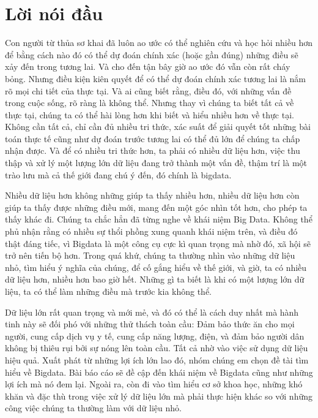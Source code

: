 \documentclass[12pt]{report}
\begin{document}

\newpage
\setcounter{page}{1}
\tableofcontents
\newpage
\chapter*{Lời nói đầu}
Con người từ thủa sơ khai đã luôn ao ước có thể nghiên cứu và học hỏi nhiều hơn để bằng cách nào đó có thể dự đoán chính xác (hoặc gần đúng) những điều sẽ xảy đến trong tương lai. Và cho đến tận bây giờ ao ước đó vẫn còn rất cháy bỏng. Nhưng điều kiện kiên quyết để có thể dự đoán chính xác tương lai là nắm rõ mọi chi tiết của thực tại. Và ai cũng biết rằng, điều đó, với những vấn đề trong cuộc sống, rõ ràng là không thể. Nhưng thay vì chúng ta biết tất cả về thực tại, chúng ta có thể hài lòng hơn khi biết và hiểu nhiều hơn về thực tại. Không cần tất cả, chỉ cần đủ nhiều tri thức, xác suất để giải quyết tốt những bài toán thực tế cũng như dự đoán trước tương lai có thể đủ lớn để chúng ta chấp nhận được. Và để có nhiều tri thức hơn, ta phải có nhiều dữ liệu hơn, việc thu thập và xử lý một lượng lớn dữ liệu đang trở thành một vấn đề, thậm trí là một trào lưu mà cả thế giới đang chú ý đến, đó chính là bigdata. 

Nhiều dữ liệu hơn không những giúp ta thấy nhiều hơn, nhiều dữ liệu hơn còn giúp ta thấy được những điều mới, mang đến một góc nhìn tốt hơn, cho phép ta thấy khác đi. Chúng ta chắc hẳn đã từng nghe về khái niệm Big Data. Không thể phủ nhận rằng có nhiều sự thổi phồng xung quanh khái niệm trên, và điều đó thật đáng tiếc, vì Bigdata là một công cụ cực kì quan trọng mà nhờ đó, xã hội sẽ trở nên tiến bộ hơn. Trong quá khứ, chúng ta thường nhìn vào những dữ liệu nhỏ, tìm hiểu ý nghĩa của chúng, để cố gắng hiểu về thế giới, và giờ, ta có nhiều dữ liệu hơn, nhiều hơn bao giờ hết. Những gì ta biết là khi có một lượng lớn dữ liệu, ta có thể làm những điều mà trước kia không thể. 

Dữ liệu lớn rất quan trọng và mới mẻ, và đó có thể là cách duy nhất mà hành tinh này sẽ đối phó với những thử thách toàn cầu: Đảm bảo thức ăn cho mọi người, cung cấp dịch vụ y tế, cung cấp năng lượng, điện, và đảm bảo người dân không bị thiêu rụi bởi sự nóng lên toàn cầu. Tất cả nhờ vào việc sử dụng dữ liệu hiệu quả. Xuất phát từ những lợi ích lớn lao đó, nhóm chúng em chọn đề tài tìm hiểu về Bigdata.
Bài báo cáo sẽ đề cập đến khái niệm về Bigdata cũng như những lợi ích mà nó đem lại. Ngoài ra, còn đi vào tìm hiểu cơ sở khoa học, những khó khăn và đặc thù trong việc xử lý dữ liệu lớn mà phải thực hiện khác so với những công việc chúng ta thường làm với dữ liệu nhỏ.
\end{document}
